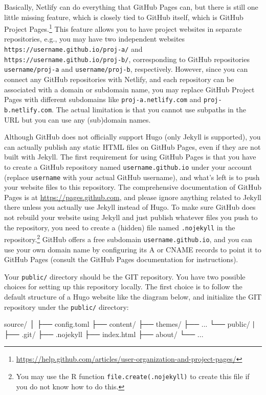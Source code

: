 \documentclass[12pt,]{krantz}
\makeatletter
\newenvironment{Shaded}{\begin{snugshade}}{\end{snugshade}}
\newcommand{\KeywordTok}[1]{\textcolor[rgb]{0.13,0.29,0.53}{\textbf{#1}}}
\newcommand{\ExtensionTok}[1]{#1}
\newcommand{\NormalTok}[1]{#1}
\renewcommand{\href}[2]{#2\footnote{\url{#1}}}
\newenvironment{kframe}{%
\medskip{}
\setlength{\fboxsep}{.8em}
 \def\at@end@of@kframe{}%
 \ifinner\ifhmode%
  \def\at@end@of@kframe{\end{minipage}}%
  \begin{minipage}{\columnwidth}%
 \fi\fi%
 \def\FrameCommand##1{\hskip\@totalleftmargin \hskip-\fboxsep
 \colorbox{shadecolor}{##1}\hskip-\fboxsep
     \hskip-\linewidth \hskip-\@totalleftmargin \hskip\columnwidth}%
 \MakeFramed {\advance\hsize-\width
   \@totalleftmargin\z@ \linewidth\hsize
   \@setminipage}}%
 {\par\unskip\endMakeFramed%
 \at@end@of@kframe}
\renewenvironment{Shaded}{\begin{kframe}}{\end{kframe}}
\theoremstyle{definition}
\theoremstyle{definition}
\theoremstyle{definition}
\theoremstyle{remark}
\makeatother
\begin{document}
Basically, Netlify can do everything that GitHub Pages can, but there is
still one little missing feature, which is closely tied to GitHub
itself, which is GitHub
\href{https://help.github.com/articles/user-organization-and-project-pages/}{Project
Pages.} This feature allows you to have project websites in separate
repositories, e.g., you may have two independent websites
\texttt{https://username.github.io/proj-a/} and
\texttt{https://username.github.io/proj-b/}, corresponding to GitHub
repositories \texttt{username/proj-a} and \texttt{username/proj-b},
respectively. However, since you can connect any GitHub repositories
with Netlify, and each repository can be associated with a domain or
subdomain name, you may replace GitHub Project Pages with different
subdomains like \texttt{proj-a.netlify.com} and
\texttt{proj-b.netlify.com}. The actual limitation is that you cannot
use subpaths in the URL but you can use any (sub)domain names.

Although GitHub does not officially support Hugo (only Jekyll is
supported), you can actually publish any static HTML files on GitHub
Pages, even if they are not built with Jekyll. The first requirement for
using GitHub Pages is that you have to create a GitHub repository named
\texttt{username.github.io} under your account (replace
\texttt{username} with your actual GitHub username), and what's left is
to push your website files to this repository. The comprehensive
documentation of GitHub Pages is at \url{https://pages.github.com}, and
please ignore anything related to Jekyll there unless you actually use
Jekyll instead of Hugo. To make sure GitHub does not rebuild your
website using Jekyll and just publish whatever files you push to the
repository, you need to create a (hidden) file named \texttt{.nojekyll}
in the repository.\footnote{You may use the R function
  \texttt{file.create(\textquotesingle{}.nojekyll\textquotesingle{})} to
  create this file if you do not know how to do this.} GitHub offers a
free subdomain \texttt{username.github.io}, and you can use your own
domain name by configuring its A or CNAME records to point it to GitHub
Pages (consult the GitHub Pages documentation for instructions).

Your \texttt{public/} directory should be the GIT repository. You have
two possible choices for setting up this repository locally. The first
choice is to follow the default structure of a Hugo website like the
diagram below, and initialize the GIT repository under the
\texttt{public/} directory:

\begin{Shaded}
\begin{Highlighting}[]
\ExtensionTok{source/}
\NormalTok{│}
\NormalTok{├── }\ExtensionTok{config.toml}
\NormalTok{├── }\ExtensionTok{content/}
\NormalTok{├── }\ExtensionTok{themes/}
\NormalTok{├── }\ExtensionTok{...}
\NormalTok{└── }\ExtensionTok{public/}
    \KeywordTok{|}
\NormalTok{    ├── }\ExtensionTok{.git/}
\NormalTok{    ├── }\ExtensionTok{.nojekyll}
\NormalTok{    ├── }\ExtensionTok{index.html}
\NormalTok{    ├── }\ExtensionTok{about/}
\NormalTok{    └── }\ExtensionTok{...}
\end{Highlighting}
\end{Shaded}
\end{document}
